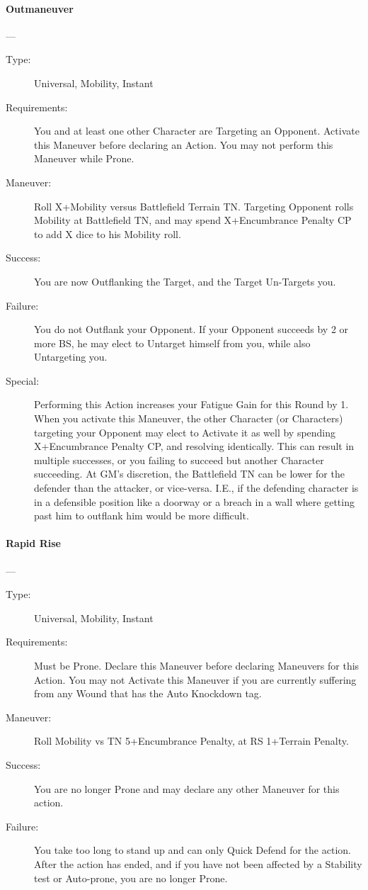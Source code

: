 \documentclass[oneside,11pt,english]{book}
\begin{document}
\paragraph{\large\label{man:Outmaneuver}Outmaneuver}---
\vspace{-10pt}\begin{description} 
\item [Type:] Universal, Mobility, Instant 
\item [Requirements:] You and at least one other Character are Targeting an Opponent. Activate this Maneuver 
  before declaring an Action. You may not perform this Maneuver while Prone. 
\item [Maneuver:] Roll X+Mobility versus Battlefield Terrain TN. Targeting Opponent rolls Mobility at 
  Battlefield TN, and may spend X+Encumbrance Penalty CP to add X dice to his Mobility roll. 
\item [Success:] You are now Outflanking the Target, and the Target Un-Targets you. 
\item [Failure:] You do not Outflank your Opponent. If your Opponent succeeds by 2 or more BS, he may elect 
  to Untarget himself from you, while also Untargeting you. 
\item [Special:] Performing this Action increases your Fatigue Gain for this Round by 1. 
  When you activate this Maneuver, the other Character (or Characters) targeting your Opponent may elect 
  to Activate it as well by spending X+Encumbrance Penalty CP, and resolving identically. This can result 
  in multiple successes, or you failing to succeed but another Character succeeding. 
  At GM’s discretion, the Battlefield TN can be lower for the defender than the attacker, or vice-versa. I.E., 
  if the defending character is in a defensible position like a doorway or a breach in a wall where getting 
  past him to outflank him would be more difficult. 
\end{description}
\paragraph{\large\label{man:Rapid Rise}Rapid Rise}---
\vspace{-10pt}\begin{description} 
\item [Type:] Universal, Mobility, Instant 
\item [Requirements:] Must be Prone. Declare this Maneuver before declaring Maneuvers for this Action. You 
  may not Activate this Maneuver if you are currently suffering from any Wound that has the Auto 
  Knockdown tag. 
\item [Maneuver:] Roll Mobility vs TN 5+Encumbrance Penalty, at RS 1+Terrain Penalty. 
\item [Success:] You are no longer Prone and may declare any other Maneuver for this action. 
\item [Failure:] You take too long to stand up and can only Quick Defend for the action. After the action has 
  ended, and if you have not been affected by a Stability test or Auto-prone, you are no longer Prone.
\end{description}
\end{document}

